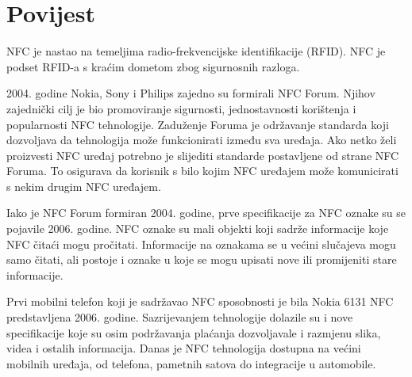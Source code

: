 \documentclass[times, utf8, zavrsni]{fer}
\begin{document}
\section{Povijest}
NFC je nastao na temeljima radio-frekvencijske identifikacije (RFID). NFC je podset RFID-a s kraćim dometom zbog sigurnosnih razloga.\par 
2004. godine Nokia, Sony i Philips zajedno su formirali NFC Forum. Njihov zajednički cilj je bio promoviranje sigurnosti, jednostavnosti korištenja i popularnosti NFC tehnologije. Zaduženje Foruma je održavanje standarda koji dozvoljava da tehnologija može funkcionirati između sva uređaja. Ako netko želi proizvesti NFC uređaj potrebno je slijediti standarde postavljene od strane NFC Foruma. To osigurava da korisnik s bilo kojim NFC uređajem može komunicirati s nekim drugim NFC uređajem.\par
Iako je NFC Forum formiran 2004. godine, prve specifikacije za NFC oznake su se pojavile 2006. godine. NFC oznake su mali objekti koji sadrže informacije koje NFC čitaći mogu pročitati. Informacije na oznakama se u većini slučajeva mogu samo čitati, ali postoje i oznake u koje se mogu upisati nove ili promijeniti stare informacije.\par 
Prvi mobilni telefon koji je sadržavao NFC sposobnosti je bila Nokia 6131 NFC predstavljena 2006. godine. Sazrijevanjem tehnologije dolazile su i nove specifikacije koje su osim podržavanja plaćanja dozvoljavale i razmjenu slika, videa i ostalih informacija. Danas je NFC tehnologija dostupna na većini mobilnih uređaja, od telefona, pametnih satova do integracije u automobile.
\citep{3}
\end{document}

